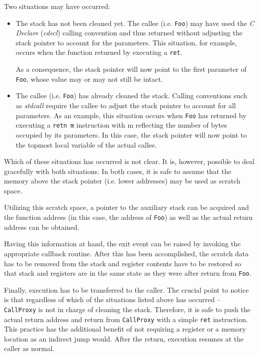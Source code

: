 Two situations may have occurred:
\begin{itemize}
	\item The stack has not been cleaned yet. The callee (i.e. \verb|Foo|) may have used
		the \emph{C Declare} (\emph{cdecl}) calling convention and thus returned
		without adjusting the stack pointer to account for the parameters. This situation, 
		for example, occurs when the function returned by executing a \verb|ret|.
		
		As a consequence, the stack pointer will now point to the first parameter 
		of \verb|Foo|, whose value may or may not still be intact. 
		
	\item The callee (i.e. \verb|Foo|) has already cleaned the stack. Calling conventions
		such as \emph{stdcall} require the callee to adjust the stack pointer to account
		for all parameters. As an example, this situation occurs when \verb|Foo| has 
		returned by executing a \verb|retn m| instruction with m reflecting the number of bytes
		occupied by its parameters. In this case, the stack pointer will now point to the
		topmost local variable of the actual callee.
\end{itemize}

Which of these situations has occurred is not clear. It is, however, possible
to deal gracefully with both situations. In both cases, it is safe to assume that
the memory above the stack pointer (i.e. lower addresses) may be used as scratch
space. 

Utilizing this scratch space, a pointer to the auxiliary stack can be acquired and
the function address (in this case, the address of \verb|Foo|) as well as the actual 
return address can be obtained.

Having this information at hand, the exit event can be raised by invoking the 
appropriate callback routine. After this has been accomplished, the scratch
data has to be removed from the stack and register contents have to be restored
so that stack and registers are in the same state as they were after return 
from \verb|Foo|.

Finally, execution has to be transferred to the caller. The crucial point to notice
is that regardless of which of the situations listed above has occurred -- 
\verb|CallProxy| is not in charge of cleaning the stack. Therefore, it is safe
to push the actual return address and return from \verb|CallProxy| with a simple
\verb|ret| instruction. This practice has the additional benefit of not requiring
a register or a memory location as an indirect jump would. After the return,
execution resumes at the caller as normal.

